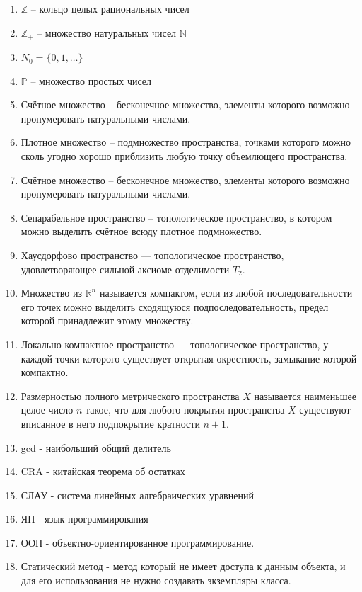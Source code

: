 \documentclass[master, och, diploma, times]{sty/SCWorks}
\theoremstyle{plain}
\theoremstyle{definition}
\begin{document}
\begin{enumerate}
	\item $\mathbb {Z}$ -- кольцо целых рациональных чисел
	\item $\mathbb {Z}_{+}$ -- множество натуральных чисел $\mathbb {N}$
	\item ${N}_0=\{0,1,\dots\}$
	\item $\mathbb {P}$ -- множество простых чисел
	\item Счётное множество -- бесконечное множество, элементы которого возможно пронумеровать натуральными числами.
	\item Плотное множество -- подмножество пространства, точками которого можно сколь угодно хорошо приблизить любую точку объемлющего пространства.
	\item Счётное множество -- бесконечное множество, элементы которого возможно пронумеровать натуральными числами.
	\item Сепарабельное пространство -- топологическое пространство, в котором можно выделить счётное всюду плотное подмножество.
	\item Хаусдорфово пространство — топологическое пространство, удовлетворяющее сильной аксиоме отделимости $T_2$.
	\item Множество из $\mathbb {R}^n$ называется компактом, если из любой последовательности его точек можно выделить сходящуюся подпоследовательность, предел которой принадлежит этому множеству.
	\item Локально компактное пространство — топологическое пространство, у каждой точки которого существует открытая окрестность, замыкание которой компактно.
	\item Размерностью полного метрического пространства $X$ называется наименьшее целое число $n$ такое, что для любого покрытия пространства $X$ существуют вписанное в него подпокрытие кратности $n+1$.
	\item gcd - наибольший общий делитель
	\item CRA - китайская теорема об остатках
	\item СЛАУ - система линейных алгебраических уравнений
	\item ЯП - язык программирования
	\item ООП - объектно-ориентированное программирование.
	\item Статический метод - метод который не имеет доступа к данным объекта, и для его использования не нужно создавать экземпляры класса.
\end{enumerate}
\end{document}
